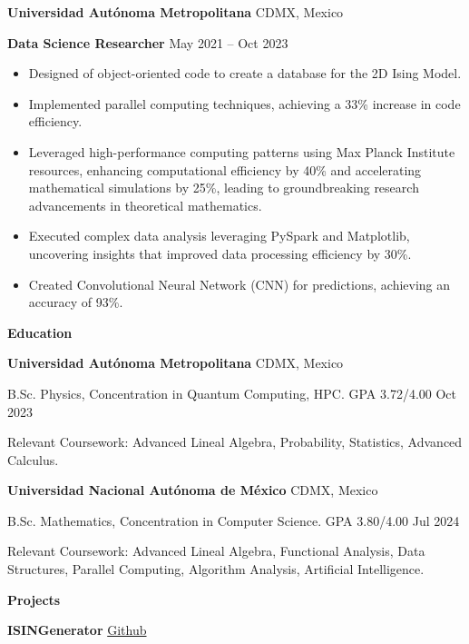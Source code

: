 \documentclass[6pt]{article}
\begin{document}
\vspace{12pt}

\textbf{Universidad Autónoma Metropolitana} \hfill CDMX, Mexico

\textbf{Data Science Researcher} \hfill May 2021 – Oct 2023
\begin{itemize}[noitemsep, topsep=0pt, partopsep=0pt, parsep=0pt]
    \item Designed of object-oriented code to create a database for the 2D Ising Model.
    \item Implemented parallel computing techniques, achieving a 33\% increase in code efficiency.
    \item Leveraged high-performance computing patterns using Max Planck Institute resources, enhancing computational efficiency by 40\% and accelerating mathematical simulations by 25\%, leading to groundbreaking research advancements in theoretical mathematics.
    \item Executed complex data analysis leveraging PySpark and Matplotlib, uncovering insights that improved data processing efficiency by 30\%.
    \item Created Convolutional Neural Network (CNN) for predictions, achieving an accuracy of 93\%.
\end{itemize}

\begin{center}
    \textbf{Education}
\end{center}
\textbf{Universidad Autónoma Metropolitana} \hfill CDMX, Mexico

B.Sc. Physics, Concentration in Quantum Computing, HPC. GPA 3.72/4.00 \hfill Oct 2023

Relevant Coursework: Advanced Lineal Algebra, Probability, Statistics, Advanced Calculus.

\vspace{12pt}

\textbf{Universidad Nacional Autónoma de México} \hfill CDMX, Mexico

B.Sc. Mathematics, Concentration in Computer Science. GPA 3.80/4.00 \hfill Jul 2024

Relevant Coursework: Advanced Lineal Algebra, Functional Analysis, Data Structures, Parallel Computing, Algorithm Analysis, Artificial Intelligence.

\vspace{12pt}
\begin{center}
    \textbf{Projects}
\end{center}
\textbf{ISINGenerator} \hfill \href{https://github.com/erick-rios/ISINGenerator}{Github}
\end{document}
